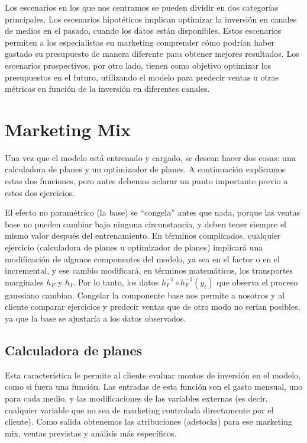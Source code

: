 Los escenarios en los que nos centramos se pueden dividir en dos categorías principales. Los escenarios hipotéticos implican optimizar la inversión en canales de medios en el pasado, cuando los datos están disponibles. Estos escenarios permiten a los especialistas en marketing comprender cómo podrían haber gastado su presupuesto de manera diferente para obtener mejores resultados. Los escenarios prospectivos, por otro lado, tienen como objetivo optimizar los presupuestos en el futuro, utilizando el modelo para predecir ventas u otras métricas en función de la inversión en diferentes canales.

\section{Marketing Mix}
\label{sec:optimizing}

Una vez que el modelo está entrenado y cargado, se desean hacer dos cosas: una calculadora de planes y un optimizador de planes. A continuación explicamos estas dos funciones, pero antes debemos aclarar un punto importante previo a estos dos ejercicios.

El efecto no paramétrico (la base) se ``congela'' antes que nada, porque las ventas base no pueden cambiar bajo ninguna circunstancia, y deben tener siempre el mismo valor después del entrenamiento. En términos complicados, cualquier ejercicio (calculadora de planes u optimizador de planes) implicará una modificación de algunos componentes del modelo, ya sea en el factor o en el incremental, y ese cambio modificará, en términos matemáticos, los transportes marginales \(h_F\) y \(h_I\). Por lo tanto, los datos \(h_I^{-1} \circ h_F^{-1}(y_t)\) que observa el proceso gaussiano cambian. Congelar la componente base nos permite a nosotros y al cliente comparar ejercicios y predecir ventas que de otro modo no serían posibles, ya que la base se ajustaría a los datos observados.

\subsection{Calculadora de planes}

Esta característica le permite al cliente evaluar montos de inversión en el modelo, como si fuera una función. Las entradas de esta función son el gasto mensual, uno para cada medio, y las modificaciones de las variables externas (es decir, cualquier variable que no sea de marketing controlada directamente por el cliente). Como salida obtenemos las atribuciones (adstocks) para ese marketing mix, ventas previstas y análisis más específicos.

